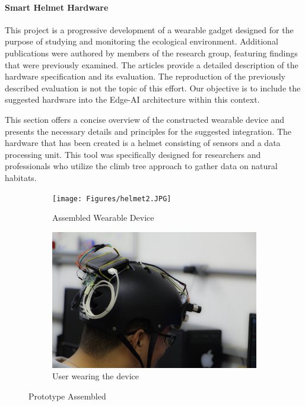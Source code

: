 \paragraph{Smart Helmet Hardware}

This project is a progressive development of a wearable gadget designed for the purpose of studying and monitoring the ecological environment. Additional publications were authored by members of the research group, featuring findings that were previously examined. The articles \cite{silva2019toward, silva2019desenvolvimento} provide a detailed description of the hardware specification and its evaluation. The reproduction of the previously described evaluation is not the topic of this effort. Our objective is to include the suggested hardware into the Edge-AI architecture within this context.

This section offers a concise overview of the constructed wearable device and presents the necessary details and principles for the suggested integration. The hardware that has been created is a helmet consisting of sensors and a data processing unit. This tool was specifically designed for researchers and professionals who utilize the climb tree approach to gather data on natural habitats. 

\begin{figure}[ht]
\centering
\begin{subfigure}{.45\textwidth}
  \centering
  \texttt{[image: Figures/helmet2.JPG]}  
  \caption{Assembled Wearable Device}
  \label{fig:proto}
\end{subfigure}
\begin{subfigure}{.45\textwidth}
  \centering
  \includegraphics[width=\linewidth]{Figures/prototype2.jpg}  
  \caption{User wearing the device}
  \label{fig:wearing}
\end{subfigure}
\caption{Prototype Assembled}
\label{fig:Prototype}
\end{figure}


